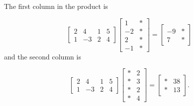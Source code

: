\documentclass[
]{book}
\theoremstyle{definition}
\theoremstyle{definition}
\theoremstyle{definition}
\theoremstyle{definition}
\theoremstyle{remark}
\begin{document}
The first column in the product is

\[\begin{bmatrix}
  2 & 4 & 1 & 5\\ 
  1 & -3 & 2 & 4
  \end{bmatrix}
  \begin{bmatrix}
  1 & *\\
  -2 & *\\
  2 & *\\
  -1 & *
    \end{bmatrix}=
    \begin{bmatrix}
  -9 & * \\ 7 & *\end{bmatrix}
  \]
and the second column is

\[\begin{bmatrix}
  2 & 4 & 1 & 5\\ 
  1 & -3 & 2 & 4
  \end{bmatrix}
  \begin{bmatrix}
  * & 2\\
  * & 3\\
  * & 2\\
  * & 4
  \end{bmatrix}=
    \begin{bmatrix}
  * & 38 \\ * & 13\end{bmatrix}.\]
\end{document}
